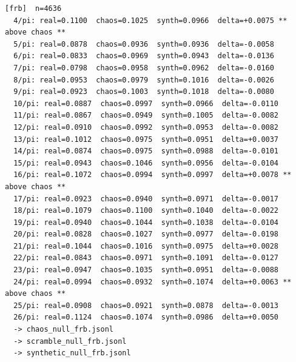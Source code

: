 \documentclass[11pt, letterpaper, openany]{book}
\begin{document}
\begin{empiricalbox}
\begin{lstlisting}[style=terminal]
[frb]  n=4636
  4/pi: real=0.1100  chaos=0.1025  synth=0.0966  delta=+0.0075 ** above chaos **
  5/pi: real=0.0878  chaos=0.0936  synth=0.0936  delta=-0.0058
  6/pi: real=0.0833  chaos=0.0969  synth=0.0943  delta=-0.0136
  7/pi: real=0.0798  chaos=0.0958  synth=0.0962  delta=-0.0160
  8/pi: real=0.0953  chaos=0.0979  synth=0.1016  delta=-0.0026
  9/pi: real=0.0923  chaos=0.1003  synth=0.1018  delta=-0.0080
  10/pi: real=0.0887  chaos=0.0997  synth=0.0966  delta=-0.0110
  11/pi: real=0.0867  chaos=0.0949  synth=0.1005  delta=-0.0082
  12/pi: real=0.0910  chaos=0.0992  synth=0.0953  delta=-0.0082
  13/pi: real=0.1012  chaos=0.0975  synth=0.0951  delta=+0.0037
  14/pi: real=0.0874  chaos=0.0975  synth=0.0988  delta=-0.0101
  15/pi: real=0.0943  chaos=0.1046  synth=0.0956  delta=-0.0104
  16/pi: real=0.1072  chaos=0.0994  synth=0.0997  delta=+0.0078 ** above chaos **
  17/pi: real=0.0923  chaos=0.0940  synth=0.0971  delta=-0.0017
  18/pi: real=0.1079  chaos=0.1100  synth=0.1040  delta=-0.0022
  19/pi: real=0.0940  chaos=0.1044  synth=0.1038  delta=-0.0104
  20/pi: real=0.0828  chaos=0.1027  synth=0.0977  delta=-0.0198
  21/pi: real=0.1044  chaos=0.1016  synth=0.0975  delta=+0.0028
  22/pi: real=0.0843  chaos=0.0971  synth=0.1091  delta=-0.0127
  23/pi: real=0.0947  chaos=0.1035  synth=0.0951  delta=-0.0088
  24/pi: real=0.0994  chaos=0.0932  synth=0.1074  delta=+0.0063 ** above chaos **
  25/pi: real=0.0908  chaos=0.0921  synth=0.0878  delta=-0.0013
  26/pi: real=0.1124  chaos=0.1074  synth=0.0986  delta=+0.0050
  -> chaos_null_frb.jsonl
  -> scramble_null_frb.jsonl
  -> synthetic_null_frb.jsonl


\end{lstlisting}
\end{empiricalbox}
\end{document}
